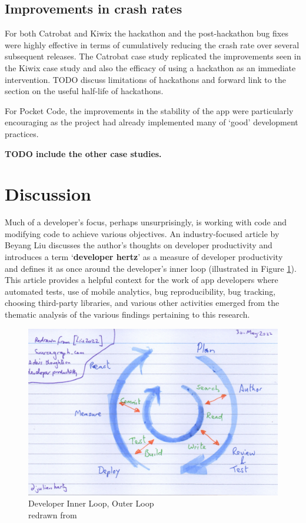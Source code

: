 \subsection{Improvements in crash rates}
For both Catrobat and Kiwix the hackathon and the post-hackathon bug fixes were highly effective in terms of cumulatively reducing the crash rate over several subsequent releases. %
The Catrobat case study replicated the improvements seen in the Kiwix case study and also the efficacy of using a hackathon as an immediate intervention. TODO discuss limitations of hackathons and forward link to the section on the useful half-life of hackathons. 


For Pocket Code, the improvements in the stability of the app were particularly encouraging as the project had already implemented many of `good' development practices.


\textbf{TODO include the other case studies.}

\section{Discussion}\label{apps-and-artefacts-discussion-section}
Much of a developer's focus, perhaps unsurprisingly, is working with code and modifying code to achieve various objectives. An industry-focused article by Beyang Liu discusses the author's thoughts on developer productivity and introduces a term `\textbf{developer hertz}' as a measure of developer productivity~\citep{liu2022_a_devs_thoughts_onDeveloper_productivity} and defines it as once around the developer's inner loop (illustrated in Figure \ref{fig:developer-inner-loop-outer-loop}). This article provides a helpful context for the work of app developers where automated tests, use of mobile analytics, bug reproducibility, bug tracking, choosing third-party libraries, and various other activities emerged from the thematic analysis of the various findings pertaining to this research.

\begin{figure}
    \centering
    \includegraphics[width=12cm]{images/rough-sketches/developer-inner-loop-outer-loop.jpeg}
    \caption{Developer Inner Loop, Outer Loop\\ redrawn from \citep{liu2022_a_devs_thoughts_onDeveloper_productivity}}
    \label{fig:developer-inner-loop-outer-loop}
\end{figure}

